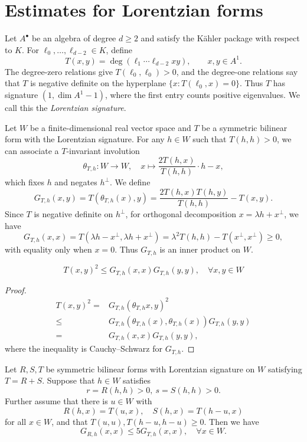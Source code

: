 \section{Estimates for Lorentzian forms}\label{sec: norms}

Let $A^\bullet$ be an algebra of degree $d\geq2$ and satisfy the
K\"ahler package with respect to $K$. For
$\ell_0,\ldots,\ell_{d-2}\in K$, define
\[
 T(x,y)=\deg(\ell_1\cdots\ell_{d-2}xy),\qquad x,y\in A^1.
\]
The degree-zero relations give $T(\ell_0,\ell_0)>0$, and the degree-one
relations say that $T$ is negative definite on the hyperplane
$\{x:T(\ell_0,x)=0\}$. Thus $T$ has signature
$(1,\dim A^1-1)$, where the first entry counts positive eigenvalues.
We call this the \textit{Lorentzian signature}.

Let $W$ be a finite-dimensional real vector space and $T$ be a symmetric bilinear form with the Lorentzian signature. For any $h\in W$ such that $T(h,h)>0$, we can associate a $T$-invariant involution
\[
    \theta_{T,h}\colon W\to W,\quad x\mapsto \frac{2T(h,x)}{T(h,h)}\cdot h-x,
\]
which fixes $h$ and negates $h^\perp$. We define
\[
    G_{T,h}(x,y)=T(\theta_{T,h}(x),y)=\frac{2T(h,x)T(h,y)}{T(h,h)}-T(x,y).
\]
Since $T$ is negative definite on $h^\perp$, for orthogonal decomposition $x=\lambda h+x^\perp$, we have
\[
G_{T,h}(x,x)=T(\lambda h-x^\perp,\lambda h+x^\perp)=\lambda^2T(h,h)-T(x^\perp,x^\perp)\geq 0,
\]
with equality only when $x=0$. Thus $G_{T,h}$ is an inner product on $W$.
\begin{lemma}\label{lem: cauchy-schwarz}
    \[
        T(x,y)^2\leq G_{T,h}(x,x)G_{T,h}(y,y),\quad \forall x,y\in W
    \]
\end{lemma}
\begin{proof}
    \begin{align*}
         T(x,y)^2=& G_{T,h}(\theta_{T,h}x,y)^2\\
         \leq& G_{T,h}(\theta_{T,h}(x),\theta_{T,h}(x))G_{T,h}(y,y)\\
         =&G_{T,h}(x,x)G_{T,h}(y,y),
    \end{align*}
    where the inequality is Cauchy--Schwarz for $G_{T,h}$.
\end{proof}
\begin{lemma}\label{lem: estimate of norms}
    Let $R,S,T$ be symmetric bilinear forms with Lorentzian signature on $W$ satisfying $T=R+S$. Suppose that $h\in W$ satisfies
    \[
        r=R(h,h)>0,\ s=S(h,h)>0.
    \]
    Further assume that there is $u\in W$ with
    \[
        R(h,x)=T(u,x),\quad S(h,x)=T(h-u,x)
    \]
    for all $x\in W$, and that $T(u,u),T(h-u,h-u)\geq 0$. Then we have
    \[
        G_{R,h}(x,x)\leq 5 G_{T,h}(x,x),\quad \forall x\in W.
    \]
\end{lemma}
